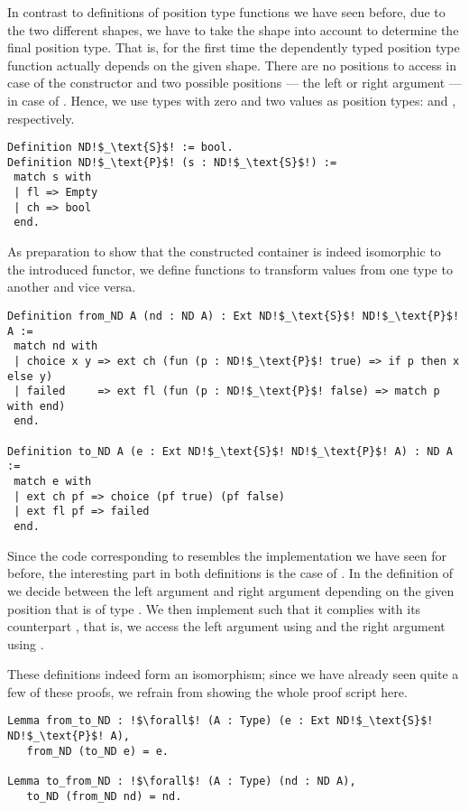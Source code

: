 In contrast to definitions of position type functions we have seen before, due to the two different shapes, we have to take the shape into account to determine the final position type.
That is, for the first time the dependently typed position type function actually depends on the given shape.
There are no positions to access in case of the  constructor and two possible positions --- the left or right argument --- in case of .
Hence, we use types with zero and two values as position types:  and , respectively.

\begin{verbatim}
Definition ND!$_\text{S}$! := bool.
Definition ND!$_\text{P}$! (s : ND!$_\text{S}$!) :=
 match s with
 | fl => Empty
 | ch => bool
 end.
\end{verbatim}

As preparation to show that the constructed container is indeed isomorphic to the introduced functor, we define functions to transform values from one type to another and vice versa.

\begin{verbatim}
Definition from_ND A (nd : ND A) : Ext ND!$_\text{S}$! ND!$_\text{P}$! A :=
 match nd with
 | choice x y => ext ch (fun (p : ND!$_\text{P}$! true) => if p then x else y)
 | failed     => ext fl (fun (p : ND!$_\text{P}$! false) => match p with end)
 end.

Definition to_ND A (e : Ext ND!$_\text{S}$! ND!$_\text{P}$! A) : ND A :=
 match e with
 | ext ch pf => choice (pf true) (pf false)
 | ext fl pf => failed
 end.
\end{verbatim}

Since the code corresponding to  resembles the implementation we have seen for  before, the interesting part in both definitions is the case of .
In the definition of  we decide between the left argument  and right argument  depending on the given position  that is of type .
We then implement  such that it complies with its counterpart , that is, we access the left argument using  and the right argument using .

These definitions indeed form an isomorphism; since we have already seen quite a few of these proofs, we refrain from showing the whole proof script here.

\begin{verbatim}
Lemma from_to_ND : !$\forall$! (A : Type) (e : Ext ND!$_\text{S}$! ND!$_\text{P}$! A),
   from_ND (to_ND e) = e.

Lemma to_from_ND : !$\forall$! (A : Type) (nd : ND A),
   to_ND (from_ND nd) = nd.
\end{verbatim}

